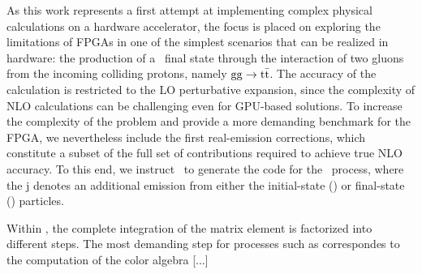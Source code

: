 As this work represents a first attempt at implementing complex physical calculations on a hardware accelerator, the focus is placed on exploring the limitations of FPGAs in one of the simplest scenarios that can be realized in hardware: the production of a \ttbar~final state through the interaction of two gluons from the incoming colliding protons, namely \(\mathrm{gg}\rightarrow\mathrm{t}\bar{\mathrm{t}}\). The accuracy of the calculation is restricted to the LO perturbative expansion, since the complexity of NLO calculations can be challenging even for GPU-based solutions. To increase the complexity of the problem and provide a more demanding benchmark for the FPGA, we nevertheless include the first real-emission corrections, which constitute a subset of the full set of contributions required to achieve true NLO accuracy. To this end, we instruct \mgfive~to generate the code for the \ggttj~process, where the $\mathrm{j}$ denotes an additional emission from either the initial-state (\gluglu) or final-state (\ttbar) particles.

Within \mgfive, the complete integration of the matrix element is factorized into different steps. The most demanding step for processes such as \ggttj correspondes to the computation of the color algebra [...] %



